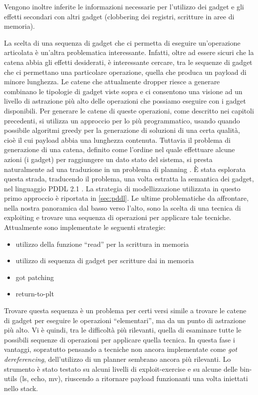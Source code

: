 Vengono inoltre inferite le informazioni necessarie per l'utilizzo dei
gadget e gli effetti secondari con altri gadget (clobbering dei
registri, scritture in aree di memoria).

La scelta di una sequenza di gadget che ci permetta di eseguire
un'operazione articolata è un'altra problematica
interessante. Infatti, oltre ad essere sicuri che la catena abbia gli
effetti desiderati, è interessante cercare, tra le sequenze di gadget
che ci permettano una particolare operazione, quella che produca un
payload di minore lunghezza. Le catene che attualmente dropper riesce
a generare combinano le tipologie di gadget viste sopra e ci
consentono una visione ad un livello di astrazione più alto delle
operazioni che possiamo eseguire con i gadget disponibili. Per
generare le catene di queste operazioni, come descritto nei capitoli
precedenti, si utilizza un approccio per lo più programmatico, usando
quando possibile algoritmi greedy per la generazione di soluzioni di
una certa qualità, cioè il cui payload abbia una lunghezza
contenuta. Tuttavia il problema di generazione di una catena, definito
come l'ordine nel quale effettuare alcune azioni (i gadget) per
raggiungere un dato stato del sistema, si presta naturalmente ad una
traduzione in un problema di planning . È stata esplorata questa
strada, traducendo il problema, una volta estratta la semantica dei
gadget, nel linguaggio PDDL 2.1 \cite{pddl-97,fox-03}. La strategia
di modellizzazione utilizzata in questo primo approccio è riportata in
\ref{sec:pddl}. Le ultime problematiche da affrontare, nella nostra
panoramica dal basso verso l'alto, sono la scelta di una tecnica di
exploiting e trovare una sequenza di operazioni per applicare tale
tecniche.  Attualmente sono implementate le seguenti strategie:

\begin{itemize}
\item utilizzo della funzione ``read'' per la scrittura in memoria
\item utilizzo di sequenza di gadget per scritture dai in memoria
\item got patching
\item return-to-plt
\end{itemize}

Trovare questa sequenza è un problema per certi versi simile a trovare
le catene di gadget per eseguire le operazioni ``elementari'', ma da un
punto di astrazione più alto.  Vi è quindi, tra le difficoltà più
rilevanti, quella di esaminare tutte le possibili sequenze di
operazioni per applicare quella tecnica. In questa fase i vantaggi,
sopratutto pensando a tecniche non ancora implementate come \emph{got
  dereferencing}, dell'utilizzo di un planner sembrano ancora più
rilevanti. Lo strumento è stato testato su alcuni livelli di
exploit-exercise\cite{exploit-exercise} e su alcune delle bin-utils
(ls, echo, mv), riuscendo a ritornare payload funzionanti una volta
iniettati nello stack.

